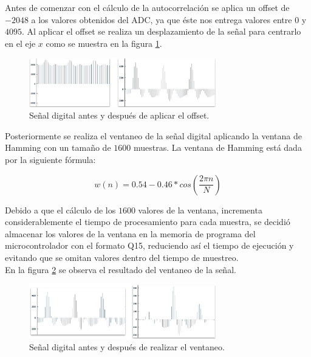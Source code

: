 \documentclass[journal]{IEEEtran}
\begin{document}
Antes de comenzar con el cálculo de la autocorrelación se aplica un offset de $-2048$ a los valores obtenidos del ADC, ya que éste nos entrega valores entre $0$ y $4095$. Al aplicar el offset se realiza un desplazamiento de la señal para centrarlo en el eje $x$ como se muestra en la figura \ref{fig:offset}. \\

\begin{figure}[htbp!]
	\centering
	\includegraphics[width=3.2in]{AvancesPruebas/imagenes/offset.png}
	\caption{Señal digital antes y después de aplicar el offset.}
	\label{fig:offset}
\end{figure}

Posteriormente se realiza el ventaneo de la señal digital aplicando la ventana de Hamming con un tamaño de $1600$ muestras. La ventana de Hamming está dada por la siguiente fórmula: 

\begin{equation}
	\label{eq_hamming}
	w(n) = 0.54 - 0.46 * cos(\frac{2\pi n}{N})
\end{equation}

Debido a que el cálculo de los $1600$ valores de la ventana, incrementa considerablemente el tiempo de procesamiento para cada muestra, se decidió almacenar los valores de la ventana en la memoria de programa del microcontrolador con el formato Q15, reduciendo así el tiempo de ejecución y evitando que se omitan valores dentro del tiempo de muestreo. \\

En la figura \ref{fig:ventaneo} se observa el resultado del ventaneo de la señal. \\

\begin{figure}[htbp!]
	\centering
	\includegraphics[width=3.2in]{AvancesPruebas/imagenes/ventaneo.png}
	\caption{Señal digital antes y después de realizar el ventaneo.}
	\label{fig:ventaneo}
\end{figure}
\end{document}
